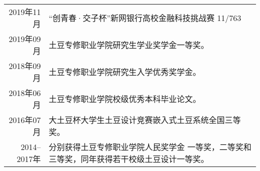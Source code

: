 


\begin{tabular}{rl}	
	2019年11月  & “创青春·交子杯”新网银行高校金融科技挑战赛 11/763 \\
	2019年09月  & 土豆专修职业学院研究生学业奖学金一等奖。 \\ 
	2018年09月  & 土豆专修职业学院研究生入学优秀奖学金。 \\
	2018年06月  & 土豆专修职业学院校级优秀本科毕业论文。 \\
	2016年07月  & 大土豆杯大学生土豆设计竞赛嵌入式土豆系统全国三等奖。 \\
	2014--2017年 & 分别获得土豆专修职业学院人民奖学金 一等奖，二等奖和三等奖，同年获得若干校级土豆设计一等奖。
\end{tabular}

